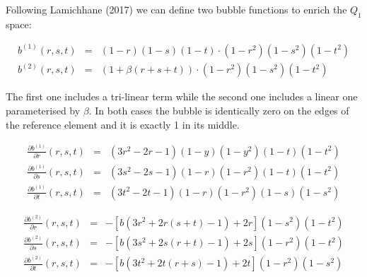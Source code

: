 Following Lamichhane (2017) \cite{lami17} we can define two bubble functions to enrich the 
$Q_1$ space:

\begin{eqnarray}
b^{(1)} (r,s,t) &=& (1-r)(1-s)(1-t) \cdot (1-r^2) (1-s^2) (1-t^2) \\
b^{(2)} (r,s,t) &=& (1 + \beta(r+s+t)) \cdot (1-r^2) (1-s^2) (1-t^2) 
\end{eqnarray}

The first one includes a tri-linear term while the second one includes a linear one parameterised by $\beta$.
In both cases the bubble is identically zero on the edges of the reference element and it is exactly 1 
in its middle.

\begin{eqnarray}
\frac{\partial b^{(1)}}{\partial r}(r,s,t) &=& (3r^2-2r-1)(1-y)(1-y^2)(1-t)(1-t^2) \\ 
\frac{\partial b^{(1)}}{\partial s}(r,s,t) &=& (3s^2-2s-1)(1-r)(1-r^2)(1-t)(1-t^2) \\ 
\frac{\partial b^{(1)}}{\partial t}(r,s,t) &=& (3t^2-2t-1)(1-r)(1-r^2)(1-s)(1-s^2)  
\end{eqnarray}

\begin{eqnarray}
\frac{\partial b^{(2)}}{\partial r}(r,s,t) &=&  -[b(3r^2+2r(s+t)-1)+2r](1-s^2)(1-t^2)\\
\frac{\partial b^{(2)}}{\partial s}(r,s,t) &=&  -[b(3s^2+2s(r+t)-1)+2s](1-r^2)(1-t^2)\\
\frac{\partial b^{(2)}}{\partial t}(r,s,t) &=&  -[b(3t^2+2t(r+s)-1)+2t](1-r^2)(1-s^2)
\end{eqnarray}












